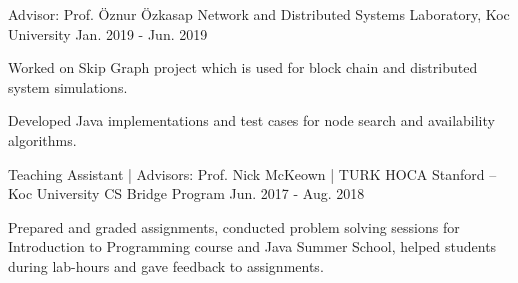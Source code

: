 
\begin{cventries}
  \cvopenentry
    {Advisor: Prof. Öznur Özkasap} %
    {Network and Distributed Systems Laboratory, Koc University} %
    {}
    {Jan. 2019 - Jun. 2019} %
    {
      \begin{cvitems} %
        \item {Worked on Skip Graph project which is used for block chain and distributed system simulations.}
        \item {Developed Java implementations and test cases for node search and availability algorithms.}
      \end{cvitems}
    }

  \cvopenentry
    {Teaching Assistant | Advisors: Prof. Nick McKeown | TURK HOCA} %
    {Stanford – Koc University CS Bridge Program} %
    {}
    {Jun. 2017 - Aug. 2018} %
    {
      \begin{cvitems} %
        \item {Prepared and graded assignments, conducted problem solving sessions for Introduction to Programming course and Java Summer School, helped students during lab-hours and gave feedback to assignments.}
      \end{cvitems}
    }


\end{cventries}
